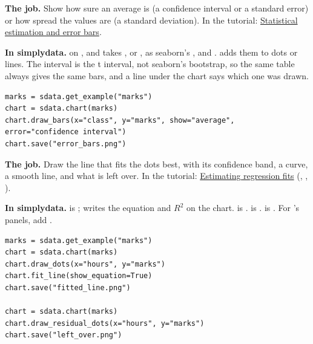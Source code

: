 
\textbf{The job.} Show how sure an average is (a confidence interval or a standard error) or how
spread the values are (a standard deviation). In the tutorial:
\href{https://seaborn.pydata.org/tutorial/error_bars.html}{Statistical estimation and error bars}.

\textbf{In simplydata.}  on ,  and 
takes ,  or , as
seaborn's ,  and .  adds them
to dots or lines. The interval is the t interval, not seaborn's bootstrap, so the same table always
gives the same bars, and a line under the chart says which one was drawn.

\begin{lstlisting}[style=py]
marks = sdata.get_example("marks")
chart = sdata.chart(marks)
chart.draw_bars(x="class", y="marks", show="average", error="confidence interval")
chart.save("error_bars.png")
\end{lstlisting}


\textbf{The job.} Draw the line that fits the dots best, with its confidence band, a curve, a smooth
line, and what is left over. In the tutorial:
\href{https://seaborn.pydata.org/tutorial/regression.html}{Estimating regression fits}
(, , ).

\textbf{In simplydata.}  is ;  writes the
equation and $R^2$ on the chart.  is .
 is .  is .
For 's panels, add .

\begin{lstlisting}[style=py]
marks = sdata.get_example("marks")
chart = sdata.chart(marks)
chart.draw_dots(x="hours", y="marks")
chart.fit_line(show_equation=True)
chart.save("fitted_line.png")

chart = sdata.chart(marks)
chart.draw_residual_dots(x="hours", y="marks")
chart.save("left_over.png")
\end{lstlisting}


